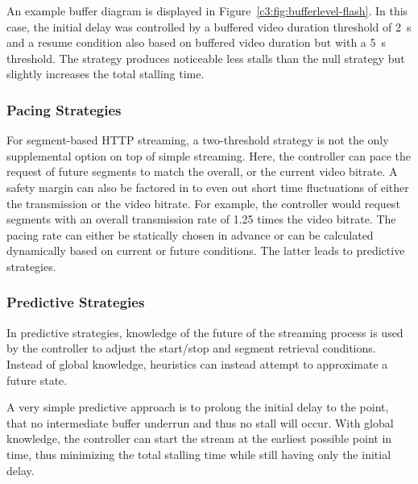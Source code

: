 An example buffer diagram is displayed in Figure~\ref{c3:fig:bufferlevel-flash}. In this case, the initial delay was controlled by a buffered video duration threshold of \SI{2}{\second} and a resume condition also based on buffered video duration but with a \SI{5}{\second} threshold. The strategy produces noticeable less stalls than the null strategy but slightly increases the total stalling time.


\subsubsection{Pacing Strategies}

For segment-based \gls{HTTP} streaming, a two-threshold strategy is not the only supplemental option on top of simple streaming. Here, the controller can pace the request of future segments to match the overall, or the current video bitrate. A safety margin can also be factored in to even out short time fluctuations of either the transmission or the video bitrate. For example, the controller would request segments with an overall transmission rate of 1.25 times the video bitrate. The pacing rate can either be statically chosen in advance or can be calculated dynamically based on current or future conditions. The latter leads to predictive strategies.


\subsubsection{Predictive Strategies}

In predictive strategies, knowledge of the future of the streaming process is used by the controller to adjust the start/stop and segment retrieval conditions. Instead of global knowledge, heuristics can instead attempt to approximate a future state.

A very simple predictive approach is to prolong the initial delay to the point, that no intermediate buffer underrun and thus no stall will occur. With global knowledge, the controller can start the stream at the earliest possible point in time, thus minimizing the total stalling time while still having only the initial delay.

